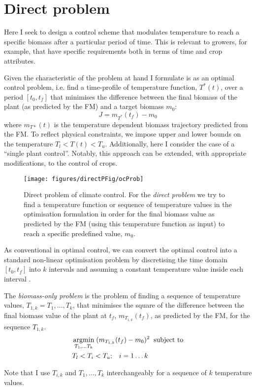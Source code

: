 \section{Direct problem}
Here I seek to design a control scheme that modulates temperature to reach a
specific biomass after a particular period of time. This is relevant to growers,
for example, that have specific requirements both in terms of time and crop
attributes.

Given the characteristic of the problem at hand I formulate is as an optimal
control problem, i.e. find a time-profile of temperature function, $T^*(t)$,
over a period $[t_0, t_f]$ that minimises the difference between the final
biomass of the plant (as predicted by the FM) and a target biomass $m_0$:
$$
J = m_{T^*}(t_f) - m_0
$$
where $m_{T*}(t)$ is the temperature dependent biomass trajectory predicted from
the FM. To reflect physical constraints, we impose upper and lower bounds on the
temperature $T_l < T(t) < T_u$. Additionally, here I consider the case of a
``single plant control''. Notably, this approach can be extended, with
appropriate modifications, to the control of crops.

\begin{figure}[tb]
\centering
\texttt{[image: figures/directPFig/ocProb]}
\caption{Direct problem of climate control. For the \emph{direct problem} we try
  to find a temperature function or sequence of temperature values in the
  optimisation formulation in order for the final biomass value as predicted by
  the FM (using this temperature function as input) to reach a specific
  predefined value, $m_0$.}
\label{fig:directP}
\end{figure}

As conventional in optimal control, we can convert the optimal control into a
standard non-linear optimisation problem by discretising the time domain
$[t_0, t_f]$ into $k$ intervals and assuming a constant temperature value inside
each interval \citep{kraft_converting_1985}.
\begin{definition}
The \emph{biomass-only problem} is the problem of finding a sequence of
temperature values, $T_{1, k}=T_1, \dots, T_k$, that minimises the square of the
difference between the final biomass value of the plant at $t_f$,
$m_{T_{1, k}}(t_f)$, as predicted by the FM, for the sequence $T_{1, k}$.
\begin{align*}
& \operatorname*{argmin}_{T_1, \dots T_k} \; (m_{T_{1, k}}(t_f) - m_0)^2 \; \; \text{subject to} \\
& T_l < T_{i} < T_u; \; \; \; i=1 \dots k
\end{align*}
\end{definition}
Note that I use $T_{i, k}$ and $T_1, \dots, T_k$ interchangeably for a sequence of
$k$ temperature values.

